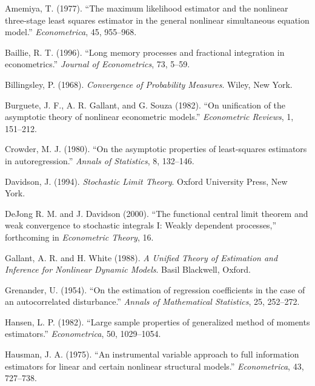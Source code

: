 \begin{description}

\item Amemiya, T. (1977). ``The maximum likelihood estimator and the nonlinear
  three-stage least squares estimator in the general nonlinear simultaneous equation model.'' \emph{Econometrica}, 45, 955--968.

\item Baillie, R. T. (1996). ``Long memory processes and fractional integration in econometrics.'' \emph{Journal of Econometrics}, 73, 5--59.

\item Billingsley, P. (1968). \emph{Convergence of Probability Measures}. Wiley, New York.

\item Burguete, J. F., A. R. Gallant, and G. Souza (1982). ``On unification of the
  asymptotic theory of nonlinear econometric models.'' \emph{Econometric Reviews}, 1,
  151--212.

\item Crowder, M. J. (1980). ``On the asymptotic properties of least-squares estimators
  in autoregression.'' \emph{Annals of Statistics}, 8, 132--146.

\item Davidson, J. (1994). \emph{Stochastic Limit Theory}. Oxford University Press, New York.

\item DeJong R. M. and J. Davidson (2000). ``The functional central limit theorem
  and weak convergence to stochastic integrals I: Weakly dependent processes,''
  forthcoming in \emph{Econometric Theory}, 16.

\item Gallant, A. R. and H. White (1988). \emph{A Unified Theory of Estimation and Inference for Nonlinear Dynamic Models}. Basil Blackwell, Oxford.

\item Grenander, U. (1954). ``On the estimation of regression coefficients in the case
  of an autocorrelated disturbance.'' \emph{Annals of Mathematical Statistics}, 25, 252--272.

\item Hansen, L. P. (1982). ``Large sample properties of generalized method of moments
  estimators.'' \emph{Econometrica}, 50, 1029--1054.

\item Hausman, J. A. (1975). ``An instrumental variable approach to full information
  estimators for linear and certain nonlinear structural models.'' \emph{Econometrica},
  43, 727--738.


\end{description}
